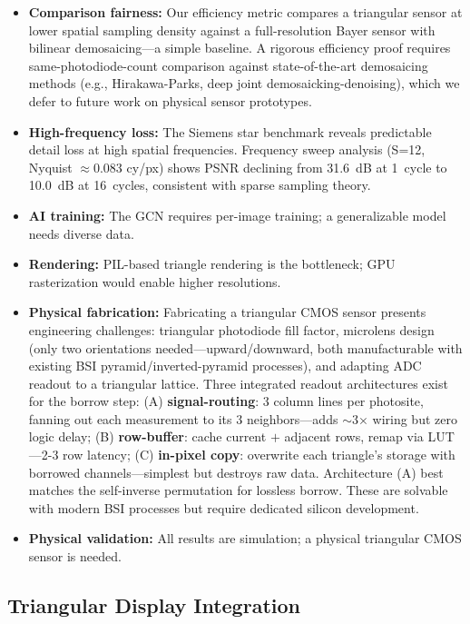 \documentclass[10pt,twocolumn,letterpaper]{article}
\begin{document}
\begin{itemize}[nosep]
\item \textbf{Comparison fairness:} Our efficiency metric compares a triangular sensor at lower spatial sampling density against a full-resolution Bayer sensor with bilinear demosaicing---a simple baseline. A rigorous efficiency proof requires same-photodiode-count comparison against state-of-the-art demosaicing methods (e.g., Hirakawa-Parks, deep joint demosaicking-denoising), which we defer to future work on physical sensor prototypes.
\item \textbf{High-frequency loss:} The Siemens star benchmark reveals predictable detail loss at high spatial frequencies. Frequency sweep analysis (S=12, Nyquist $\approx$0.083 cy/px) shows PSNR declining from 31.6~dB at 1~cycle to 10.0~dB at 16~cycles, consistent with sparse sampling theory.
\item \textbf{AI training:} The GCN requires per-image training; a generalizable model needs diverse data.
\item \textbf{Rendering:} PIL-based triangle rendering is the bottleneck; GPU rasterization would enable higher resolutions.
\item \textbf{Physical fabrication:} Fabricating a triangular CMOS sensor presents engineering challenges: triangular photodiode fill factor, microlens design (only two orientations needed---upward/downward, both manufacturable with existing BSI pyramid/inverted-pyramid processes), and adapting ADC readout to a triangular lattice. Three integrated readout architectures exist for the borrow step: (A) \textbf{signal-routing}: 3 column lines per photosite, fanning out each measurement to its 3 neighbors---adds $\sim$3$\times$ wiring but zero logic delay; (B) \textbf{row-buffer}: cache current $+$ adjacent rows, remap via LUT---2-3 row latency; (C) \textbf{in-pixel copy}: overwrite each triangle's storage with borrowed channels---simplest but destroys raw data. Architecture (A) best matches the self-inverse permutation for lossless borrow. These are solvable with modern BSI processes but require dedicated silicon development.
\item \textbf{Physical validation:} All results are simulation; a physical triangular CMOS sensor is needed.
\end{itemize}

\subsection{Triangular Display Integration}\label{sec:display}
\end{document}
